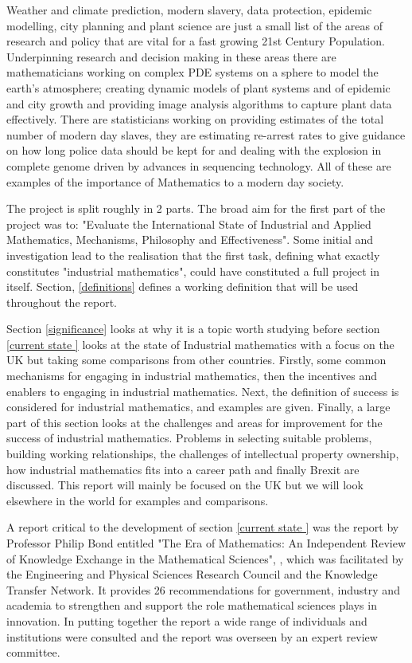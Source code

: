 \documentclass[11pt]{article} %
\begin{document}
	
	Weather and climate prediction, modern slavery, data protection, epidemic modelling, city planning and  plant science are just a small list of the areas of research and policy that are vital for a fast growing 21st Century Population. Underpinning research and decision making in these areas there are mathematicians working on complex PDE systems on a sphere to model the earth's atmosphere; creating dynamic models of plant systems and of epidemic and city growth and  providing image analysis algorithms to capture plant data effectively. There are  statisticians working on providing estimates of the total number of modern day slaves, they are estimating re-arrest rates to give guidance on how long police data should be kept for and dealing with the explosion in complete genome driven by advances in sequencing technology. All of these are examples of the importance of Mathematics to a modern day society.
	 
	
	The project is split roughly in 2 parts. The broad aim for the first part of the project was to: "Evaluate the  International State of Industrial and Applied Mathematics, Mechanisms, Philosophy and Effectiveness". Some initial and investigation lead to the realisation that the first task, defining what exactly constitutes "industrial mathematics", could have constituted a full project in itself.  Section, \ref{definitions} defines a working definition that will be used throughout the report. 
	
	Section \ref{significance} looks at why it is  a topic worth studying before section \ref{current state } looks at the state of Industrial mathematics with a focus on the UK but taking some comparisons from other countries.  Firstly, some common mechanisms for engaging in industrial mathematics, then the incentives and enablers to engaging in industrial mathematics. Next, the definition of success is considered for industrial mathematics, and examples are given. Finally, a large part of this section looks at the challenges and areas for improvement for the success of industrial mathematics. Problems in selecting suitable problems, building working relationships, the challenges of intellectual property ownership, how industrial mathematics fits into a career path and finally Brexit are discussed. This report will mainly be  focused on the UK but we will look elsewhere in the world for examples and comparisons. 
	
	
	 A report critical to the development of  section \ref{current state } was the report by Professor Philip Bond entitled "The Era of Mathematics: An Independent Review of Knowledge Exchange in the Mathematical Sciences", \cite{Bond}, which was facilitated by the Engineering and Physical Sciences Research Council and the Knowledge Transfer Network. It provides 26 recommendations for government, industry and academia to strengthen and support the role mathematical sciences plays in innovation. In putting together the report a wide range of individuals and institutions were consulted and the report was overseen by an expert review committee. 
	
\end{document}
